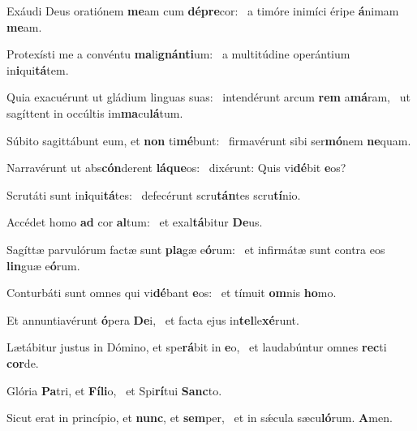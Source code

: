 \item Exáudi Deus oratiónem \textbf{me}am cum \textbf{dé}\textbf{pre}cor:~\psstar{} a timóre inimíci éripe \textbf{á}nimam \textbf{me}am.
\item Protexísti me a convéntu \textbf{ma}li\textbf{gnán}\textbf{ti}um:~\psstar{} a multitúdine operántium in\textbf{i}qui\textbf{tá}tem.
\item Quia exacuérunt ut gládium linguas suas:~\pscross{} intendérunt arcum \textbf{rem} a\textbf{má}ram,~\psstar{} ut sagíttent in occúltis im\textbf{ma}cu\textbf{lá}tum.
\item Súbito sagittábunt eum, et \textbf{non} ti\textbf{mé}bunt:~\psstar{} firmavérunt sibi ser\textbf{mó}nem \textbf{ne}quam.
\item Narravérunt ut abs\textbf{cón}derent \textbf{lá}\textbf{que}os:~\psstar{} dixérunt: Quis vi\textbf{dé}bit \textbf{e}os?
\item Scrutáti sunt in\textbf{i}qui\textbf{tá}tes:~\psstar{} defecérunt scru\textbf{tán}tes scru\textbf{tí}nio.
\item Accédet homo \textbf{ad} cor \textbf{al}tum:~\psstar{} et exal\textbf{tá}bitur \textbf{De}us.
\item Sagíttæ parvulórum factæ sunt \textbf{pla}gæ e\textbf{ó}rum:~\psstar{} et infirmátæ sunt contra eos \textbf{lin}guæ e\textbf{ó}rum.
\item Conturbáti sunt omnes qui vi\textbf{dé}bant \textbf{e}os:~\psstar{} et tímuit \textbf{om}nis \textbf{ho}mo.
\item Et annuntiavérunt \textbf{ó}pera \textbf{De}i,~\psstar{} et facta ejus in\textbf{tel}le\textbf{xé}runt.
\item Lætábitur justus in Dómino, et spe\textbf{rá}bit in \textbf{e}o,~\psstar{} et laudabúntur omnes \textbf{rec}ti \textbf{cor}de.
\item Glória \textbf{Pa}tri, et \textbf{Fí}\textbf{li}o,~\psstar{} et Spi\textbf{rí}tui \textbf{Sanc}to.
\item Sicut erat in princípio, et \textbf{nunc}, et \textbf{sem}per,~\psstar{} et in sǽcula sæcu\textbf{ló}rum. \textbf{A}men.
